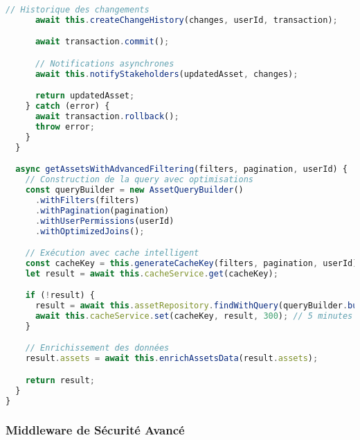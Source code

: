 \documentclass[12pt,a4paper]{report}
\begin{document}
\begin{lstlisting}[language=JavaScript, caption=Architecture backend avec DI]
      // Historique des changements
      await this.createChangeHistory(changes, userId, transaction);

      await transaction.commit();

      // Notifications asynchrones
      await this.notifyStakeholders(updatedAsset, changes);

      return updatedAsset;
    } catch (error) {
      await transaction.rollback();
      throw error;
    }
  }

  async getAssetsWithAdvancedFiltering(filters, pagination, userId) {
    // Construction de la query avec optimisations
    const queryBuilder = new AssetQueryBuilder()
      .withFilters(filters)
      .withPagination(pagination)
      .withUserPermissions(userId)
      .withOptimizedJoins();

    // Exécution avec cache intelligent
    const cacheKey = this.generateCacheKey(filters, pagination, userId);
    let result = await this.cacheService.get(cacheKey);

    if (!result) {
      result = await this.assetRepository.findWithQuery(queryBuilder.build());
      await this.cacheService.set(cacheKey, result, 300); // 5 minutes
    }

    // Enrichissement des données
    result.assets = await this.enrichAssetsData(result.assets);

    return result;
  }
}
\end{lstlisting}

\subsubsection{Middleware de Sécurité Avancé}
\end{document}
